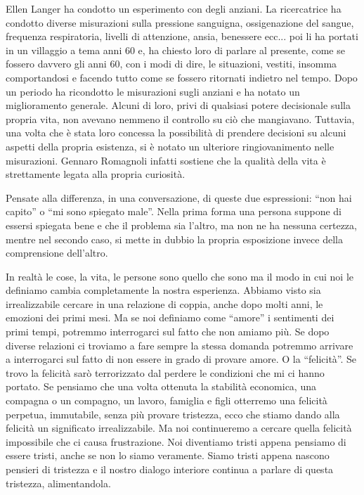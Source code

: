 \documentclass[12pt]{book} %
\begin{document}
Ellen Langer ha condotto un esperimento con degli anziani. La ricercatrice ha condotto diverse misurazioni sulla
pressione sanguigna, ossigenazione del sangue, frequenza respiratoria, livelli di attenzione, ansia, benessere ecc...
poi li ha portati in un villaggio a tema anni 60 e, ha chiesto loro di parlare al presente, come se fossero davvero gli
anni 60, con i modi di dire, le situazioni, vestiti, insomma comportandosi e facendo tutto come se fossero ritornati
indietro nel tempo. Dopo un periodo ha ricondotto le misurazioni sugli anziani e ha notato un miglioramento generale.
Alcuni di loro, privi di qualsiasi potere decisionale sulla propria vita, non avevano nemmeno il controllo su ciò che
mangiavano. Tuttavia, una volta che è stata loro concessa la possibilità di prendere decisioni su alcuni aspetti della
propria esistenza, si è notato un ulteriore ringiovanimento nelle misurazioni. Gennaro Romagnoli infatti sostiene che
la qualità della vita è strettamente legata alla propria
curiosità.

Pensate alla differenza, in una conversazione, di queste due espressioni: “non hai capito” o “mi sono spiegato male”.
Nella prima forma una persona suppone di essersi spiegata bene e che il problema sia l'altro, ma non ne ha nessuna
certezza, mentre nel secondo caso, si mette in dubbio la propria esposizione invece della comprensione dell'altro.

In realtà le cose, la vita, le persone sono quello che sono ma il modo in cui noi le definiamo cambia completamente la
nostra esperienza. Abbiamo visto sia irrealizzabile cercare in una relazione di coppia, anche dopo molti anni, le
emozioni dei primi mesi. Ma se noi definiamo come “amore” i sentimenti dei primi tempi, potremmo interrogarci sul fatto
che non amiamo più. Se dopo diverse relazioni ci troviamo a fare sempre la stessa domanda potremmo arrivare a
interrogarci sul fatto di non essere in grado di provare amore. O la “felicità”. Se trovo la felicità sarò terrorizzato
dal perdere le condizioni che mi ci hanno portato. Se pensiamo che una volta ottenuta la stabilità economica, una
compagna o un compagno, un lavoro, famiglia e figli otterremo una felicità perpetua, immutabile, senza più provare
tristezza, ecco che stiamo dando alla felicità un significato irrealizzabile. Ma noi continueremo a cercare quella
felicità impossibile che ci causa frustrazione. Noi diventiamo tristi appena pensiamo di essere tristi, anche se non lo
siamo veramente. Siamo tristi appena nascono pensieri di tristezza e il nostro dialogo interiore continua a parlare di
questa tristezza, alimentandola.
\end{document}
